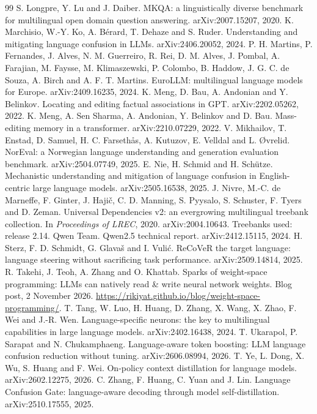 \documentclass[10pt,a4paper]{article}
\begin{document}
\begin{thebibliography}{99}
 S. Longpre, Y. Lu and J. Daiber. MKQA: a linguistically diverse benchmark for multilingual open domain question answering. arXiv:2007.15207, 2020.
 K. Marchisio, W.-Y. Ko, A. Bérard, T. Dehaze and S. Ruder. Understanding and mitigating language confusion in LLMs. arXiv:2406.20052, 2024.
 P. H. Martins, P. Fernandes, J. Alves, N. M. Guerreiro, R. Rei, D. M. Alves, J. Pombal, A. Farajian, M. Faysse, M. Klimaszewski, P. Colombo, B. Haddow, J. G. C. de Souza, A. Birch and A. F. T. Martins. EuroLLM: multilingual language models for Europe. arXiv:2409.16235, 2024.
 K. Meng, D. Bau, A. Andonian and Y. Belinkov. Locating and editing factual associations in GPT. arXiv:2202.05262, 2022.
 K. Meng, A. Sen Sharma, A. Andonian, Y. Belinkov and D. Bau. Mass-editing memory in a transformer. arXiv:2210.07229, 2022.
 V. Mikhailov, T. Enstad, D. Samuel, H. C. Farsethås, A. Kutuzov, E. Velldal and L. Øvrelid. NorEval: a Norwegian language understanding and generation evaluation benchmark. arXiv:2504.07749, 2025.
 E. Nie, H. Schmid and H. Schütze. Mechanistic understanding and mitigation of language confusion in English-centric large language models. arXiv:2505.16538, 2025.
 J. Nivre, M.-C. de Marneffe, F. Ginter, J. Hajič, C. D. Manning, S. Pyysalo, S. Schuster, F. Tyers and D. Zeman. Universal Dependencies v2: an evergrowing multilingual treebank collection. In \emph{Proceedings of LREC}, 2020. arXiv:2004.10643. Treebanks used: release 2.14.
 Qwen Team. Qwen2.5 technical report. arXiv:2412.15115, 2024.
 H. Sterz, F. D. Schmidt, G. Glavaš and I. Vulić. ReCoVeR the target language: language steering without sacrificing task performance. arXiv:2509.14814, 2025.
 R. Takehi, J. Teoh, A. Zhang and O. Khattab. Sparks of weight-space programming: LLMs can natively read \& write neural network weights. Blog post, 2 November 2026. \url{https://rikiyat.github.io/blog/weight-space-programming/}.
 T. Tang, W. Luo, H. Huang, D. Zhang, X. Wang, X. Zhao, F. Wei and J.-R. Wen. Language-specific neurons: the key to multilingual capabilities in large language models. arXiv:2402.16438, 2024.
 T. Ukarapol, P. Sarapat and N. Chukamphaeng. Language-aware token boosting: LLM language confusion reduction without tuning. arXiv:2606.08994, 2026.
 T. Ye, L. Dong, X. Wu, S. Huang and F. Wei. On-policy context distillation for language models. arXiv:2602.12275, 2026.
 C. Zhang, F. Huang, C. Yuan and J. Lin. Language Confusion Gate: language-aware decoding through model self-distillation. arXiv:2510.17555, 2025.
\end{thebibliography}
\end{document}
